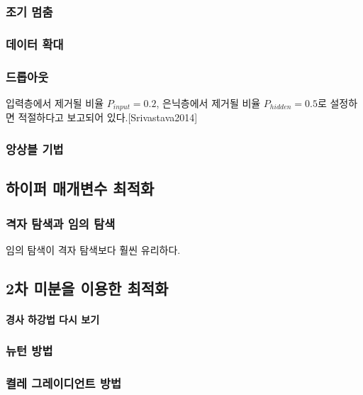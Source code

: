 \documentclass [12pt] {oblivoir}
\let\oldsubsubsection=\subsubsection
\renewcommand{\subsubsection}
{
  \filbreak
  \oldsubsubsection
}
\begin{document}
\vspace{3mm}

\subsubsection{조기 멈춤}

\subsubsection{데이터 확대}

\subsubsection{드롭아웃}

입력층에서 제거될 비율 $P_{input} = 0.2$, 은닉층에서 제거될 비율 $P_{hidden} = 0.5$로 설정하면 적절하다고 보고되어 있다.[Srivastava2014]

\subsubsection{앙상블 기법}

\subsection{하이퍼 매개변수 최적화}

\subsubsection{격자 탐색과 임의 탐색}

임의 탐색이 격자 탐색보다 훨씬 유리하다.

\subsection{2차 미분을 이용한 최적화}

\paragraph*{경사 하강법 다시 보기}\mbox{}

\vspace{3mm}

\subsubsection{뉴턴 방법}

\subsubsection{켤레 그레이디언트 방법}
\end{document}
